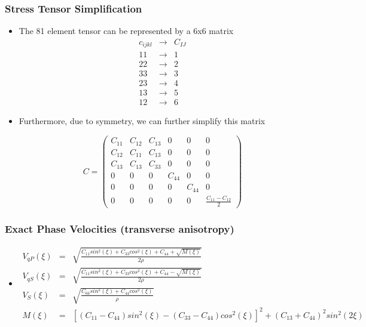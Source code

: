 \documentclass{beamer}
\begin{document}
\begin{frame}
\frametitle{Stress Tensor Simplification}

\fontsize{6pt}{7.2}\selectfont

\begin{itemize}

\pause \item
The 81 element tensor can be represented by a 6x6 matrix
\begin{eqnarray}
c_{ijkl} &\rightarrow& C_{IJ} \nonumber \\
11 &\rightarrow& 1 \nonumber \\
22 &\rightarrow& 2 \nonumber \\
33 &\rightarrow& 3 \nonumber \\
23 &\rightarrow& 4 \nonumber \\
13 &\rightarrow& 5 \nonumber \\
12 &\rightarrow& 6 \nonumber
\end{eqnarray}

\pause \item
Furthermore, due to symmetry, we can further simplify this matrix

\[ C =  \left( \begin{array}{cccccc}
C_{11} & C_{12} & C_{13} & 0 & 0 & 0 \\
C_{12} & C_{11} & C_{13} & 0 & 0 & 0 \\
C_{13} & C_{13} & C_{33} & 0 & 0 & 0 \\
0 & 0 & 0 & C_{44} & 0 & 0 \\
0 & 0 & 0 & 0 & C_{44} & 0 \\
0 & 0 & 0 & 0 & 0 & \frac{C_{11}-C_{12}}{2} \end{array} \right)\] 

\end{itemize}

\end{frame}


\begin{frame}
\frametitle{Exact Phase Velocities (transverse anisotropy)}

\fontsize{6pt}{7.2}\selectfont

\begin{itemize}

\pause \item
\begin{eqnarray}
V_{qP}(\xi) &=& \sqrt{\frac{C_{11}sin^2(\xi)+C_{33}cos^2(\xi)+C_{44}+\sqrt{M(\xi)}}{2\rho}} \nonumber \\
V_{qS}(\xi) &=& \sqrt{\frac{C_{11}sin^2(\xi)+C_{33}cos^2(\xi)+C_{44}-\sqrt{M(\xi)}}{2\rho}} \nonumber \\
V_{S}(\xi) &=& \sqrt{\frac{C_{66}sin^2(\xi)+C_{44}cos^2(\xi)}{\rho}} \nonumber \\
M(\xi) &=& \left[(C_{11}-C_{44})sin^2(\xi)-(C_{33}-C_{44})cos^2(\xi)\right]^2 + (C_{13}+C_{44})^2sin^2(2\xi) \nonumber
\end{eqnarray}

\end{itemize}

\end{frame}
\end{document}
